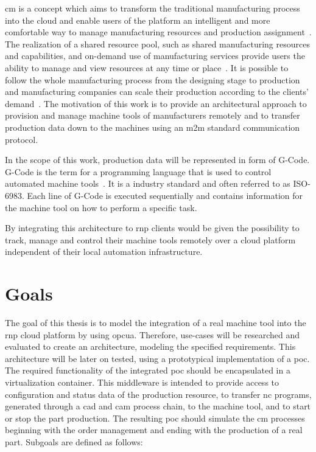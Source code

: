 \documentclass[
a4paper,
twoside,
headsepline,
cleardoublepage=empty,
parskip=half,
draft=false
]{scrbook}
\begin{document}
			\gls{cm} is a concept which aims to transform the traditional manufacturing process into the cloud and enable users of the platform an intelligent and more comfortable way to manage manufacturing resources and production assignment~\cite{xu2012cloud}. 
			The realization of a shared resource pool, such as shared manufacturing resources and capabilities, and on-demand use of manufacturing services provide users the ability to manage and view resources at any time or place~\cite{tao2011cloud}. 
			It is possible to follow the whole manufacturing process from the designing stage to production and manufacturing companies can scale their production according to the clients' demand~\cite{tao2011cloud}. 
			The motivation of this work is to provide an architectural approach to provision and manage machine tools of manufacturers remotely and to transfer production data down to the machines using an \gls{m2m} standard communication protocol.
			
			In the scope of this work, production data will be represented in form of G-Code.
			G-Code is the term for a programming language that is used to control automated machine tools~\cite{shin2007reincarnation}. 
			It is a industry standard and often referred to as ISO-6983. 
			Each line of G-Code is executed sequentially and contains information for the machine tool on how to perform a specific task.
			
			By integrating this architecture to \gls{rnp} clients would be given the possibility to track, manage and control their machine tools remotely over a cloud platform independent of their local automation infrastructure.
		
		\section{Goals}\label{sec:goals}
			
			The goal of this thesis is to model the integration of a real machine tool into the \gls{rnp} cloud platform by using \gls{opcua}.
			Therefore, use-cases will be researched and evaluated to create an architecture, modeling the specified requirements.
			This architecture will be later on tested, using a prototypical implementation of a \gls{poc}. 
			The required functionality of the integrated \gls{poc} should be encapsulated in a virtualization container. 
			This middleware is intended to provide access to configuration and status data of the production resource, to transfer \gls{nc} programs, generated through a \gls{cad} and \gls{cam} process chain, to the machine tool, and to start or stop the part production. The resulting \gls{poc} should simulate the \gls{cm} processes beginning with the order management and ending with the production of a real part.
			Subgoals are defined as follows:
			
\end{document}
